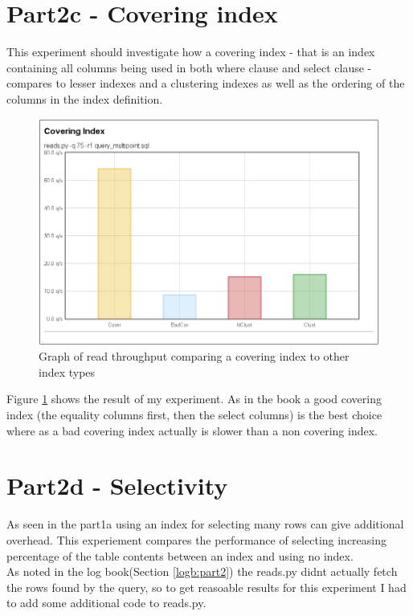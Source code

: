 \section{Part2c - Covering index}
This experiment should investigate how a covering index - that is an index
containing all columns being used in both where clause and select clause -
compares to lesser indexes and a clustering indexes as well as the ordering of
the columns in the index definition.
\begin{figure}
  \centering
  \includegraphics[width=12cm]{assignment2/cover}
  \caption[Read performance - Covering Index]{Graph of read throughput comparing a
  covering index to other index types}\label{fig:cover}
\end{figure}
Figure \ref{fig:cover} shows the result of my experiment. As in the book a good
covering index (the equality columns first, then the select columns) is the best
choice where as a bad covering index actually is slower than a non covering
index.

\section{Part2d - Selectivity}
As seen in the part1a using an index for selecting many rows can give additional
overhead. This experiement compares the performance of selecting increasing
percentage of the table contents between an index and using no index.\\

As noted in the log book(Section \ref{logb:part2}) the reads.py didnt actually
fetch the rows found by the query, so to get reasoable results for this
experiment I had to add some additional code to reads.py.

